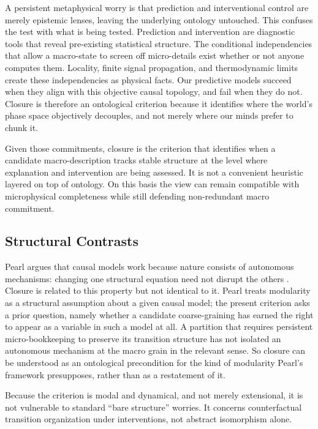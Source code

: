 A persistent metaphysical worry is that prediction and interventional
control are merely epistemic lenses, leaving the underlying ontology
untouched. This confuses the test with what is being tested. Prediction
and intervention are diagnostic tools that reveal pre-existing
statistical structure. The conditional independencies that allow a
macro-state to screen off micro-details exist whether or not anyone
computes them. Locality, finite signal propagation, and thermodynamic
limits create these independencies as physical facts. Our predictive
models succeed when they align with this objective causal topology, and
fail when they do not. Closure is therefore an ontological criterion
because it identifies where the world's phase space objectively
decouples, and not merely where our minds prefer to chunk it.

Given those commitments, closure is the criterion that identifies when a
candidate macro-description tracks stable structure at the level where
explanation and intervention are being assessed. It is not a convenient
heuristic layered on top of ontology. On this basis the view can remain
compatible with microphysical completeness while still defending
non-redundant macro commitment.

\subsection{Structural Contrasts}\label{structural-contrasts}

Pearl argues that causal models work because nature consists of
autonomous mechanisms: changing one structural equation need not disrupt
the others \citep{pearl2000}. Closure is related to this property but not identical to
it. Pearl treats modularity as a structural assumption about a given
causal model; the present criterion asks a prior question, namely
whether a candidate coarse-graining has earned the right to appear as a
variable in such a model at all. A partition that requires persistent
micro-bookkeeping to preserve its transition structure has not isolated
an autonomous mechanism at the macro grain in the relevant sense. So
closure can be understood as an ontological precondition for the kind of
modularity Pearl's framework presupposes, rather than as a restatement
of it.

Because the criterion is modal and dynamical, and not merely
extensional, it is not vulnerable to standard ``bare structure''
worries. It concerns counterfactual transition organization under
interventions, not abstract isomorphism alone.

